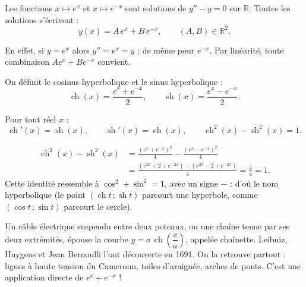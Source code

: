 \documentclass[11pt]{article}
\newcommand{\cle}[1]{{\popxbold\color{popdark}#1}}
\begin{document}
\begin{propriete}[Équation $y''-y=0$ (admise)]
Les fonctions $x\mapsto e^{x}$ et $x\mapsto e^{-x}$ sont solutions de $y''-y=0$ sur $\mathbb{R}$. Toutes les solutions s'écrivent :
\[ y(x) = A\,e^{x} + B\,e^{-x}, \qquad (A,B)\in\mathbb{R}^2. \]
\end{propriete}

En effet, si $y=e^x$ alors $y''=e^x=y$ ; de même pour $e^{-x}$. Par linéarité, toute combinaison $Ae^x+Be^{-x}$ convient.

\begin{definition}
On définit le \cle{cosinus hyperbolique} et le \cle{sinus hyperbolique} :
\[ \operatorname{ch}(x)=\frac{e^{x}+e^{-x}}{2}, \qquad \operatorname{sh}(x)=\frac{e^{x}-e^{-x}}{2}. \]
\end{definition}

\begin{propriete}
Pour tout réel $x$ :
\[ \operatorname{ch}'(x)=\operatorname{sh}(x), \qquad \operatorname{sh}'(x)=\operatorname{ch}(x), \qquad \operatorname{ch}^2(x)-\operatorname{sh}^2(x)=1. \]
\end{propriete}

\begin{experience}[Vérification de $\operatorname{ch}^2-\operatorname{sh}^2=1$]
\begin{align*}
\operatorname{ch}^2(x)-\operatorname{sh}^2(x) &= \frac{(e^x+e^{-x})^2}{4}-\frac{(e^x-e^{-x})^2}{4}\\
&= \frac{(e^{2x}+2+e^{-2x})-(e^{2x}-2+e^{-2x})}{4} = \frac{4}{4}=1.
\end{align*}
Cette identité ressemble à $\cos^2+\sin^2=1$, avec un signe $-$ : d'où le nom \og hyperbolique \fg{} (le point $(\operatorname{ch} t\,;\operatorname{sh} t)$ parcourt une hyperbole, comme $(\cos t\,;\sin t)$ parcourt le cercle).
\end{experience}

\begin{savaistu}
Un câble électrique suspendu entre deux poteaux, ou une chaîne tenue par ses deux extrémités, épouse la courbe $y=a\,\operatorname{ch}\!\left(\dfrac{x}{a}\right)$, appelée \cle{chaînette}. Leibniz, Huygens et Jean Bernoulli l'ont découverte en 1691. On la retrouve partout : lignes à haute tension du Cameroun, toiles d'araignée, arches de ponts. C'est une application directe de $e^x+e^{-x}$ !
\end{savaistu}
\end{document}
